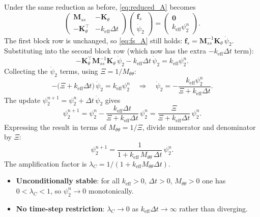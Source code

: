 \documentclass[11pt]{article}
\newcommand{\dt}{\Delta t}
\newcommand{\keff}{k_\mathrm{eff}}
\newcommand{\Mtt}{M_{\theta\theta}}
\newcommand{\Kth}{\mathbf{K}_\theta}
\newcommand{\Mss}{\mathbf{M}_{ss}}
\begin{document}
Under the same reduction as before, \eqref{eq:reduced_A} becomes
\begin{equation}\label{eq:reduced_C}
\begin{pmatrix} \Mss & -\Kth \\ -\Kth^\top & -\keff\dt \end{pmatrix}
\begin{pmatrix} \mathbf{f}_s \\ \dot\psi_2 \end{pmatrix}
=
\begin{pmatrix} \mathbf{0} \\ \keff\psi_2^n \end{pmatrix}.
\end{equation}
The first block row is unchanged, so \eqref{eq:fs_A} still holds:
$\mathbf{f}_s = \Mss^{-1}\Kth\,\dot\psi_2$.
Substituting into the second block row (which now has the extra
$-\keff\dt$ term):
\begin{equation}\label{eq:schur_C}
  -\Kth^\top\Mss^{-1}\Kth\,\dot\psi_2 - \keff\dt\,\dot\psi_2
  = \keff\psi_2^n.
\end{equation}
Collecting the $\dot\psi_2$ terms, using $\Xi = 1/\Mtt$:
\begin{equation}\label{eq:collect_C}
  -\bigl(\Xi + \keff\dt\bigr)\,\dot\psi_2 = \keff\psi_2^n
  \quad\Longrightarrow\quad
  \dot\psi_2 = -\frac{\keff\psi_2^n}{\Xi + \keff\dt}.
\end{equation}
The update $\psi_2^{n+1} = \psi_2^n + \dt\,\dot\psi_2$ gives
\begin{equation}\label{eq:amp_C_Xi}
  \psi_2^{n+1}
  = \psi_2^n - \frac{\keff\dt}{\Xi+\keff\dt}\,\psi_2^n
  = \frac{\Xi}{\Xi+\keff\dt}\,\psi_2^n.
\end{equation}
Expressing the result in terms of $\Mtt = 1/\Xi$,
divide numerator and denominator by $\Xi$:
\begin{equation}\label{eq:amp_C}
  \boxed{\psi_2^{n+1}
  = \frac{1}{1 + \keff\,\Mtt\,\dt}\,\psi_2^n.}
\end{equation}
The amplification factor is $\lambda_C = 1/(1+\keff\Mtt\dt)$.
\begin{itemize}
  \item \textbf{Unconditionally stable}: for all $\keff>0$, $\dt>0$,
        $\Mtt>0$ one has $0 < \lambda_C < 1$, so $\psi_2^n\to0$
        monotonically.
  \item \textbf{No time-step restriction}: $\lambda_C\to0$ as
        $\keff\dt\to\infty$ rather than diverging.
\end{itemize}
\end{document}
